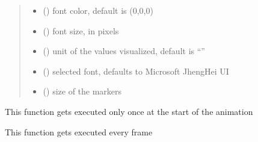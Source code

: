 \documentclass[letterpaper,10pt,english]{sphinxmanual}
\begin{document}
\begin{fulllineitems}
\begin{quote}
\begin{description}
\begin{itemize}
\item {} 
\sphinxAtStartPar
{} () \textendash{} font color, default is (0,0,0)

\item {} 
\sphinxAtStartPar
{} () \textendash{} font size, in pixels

\item {} 
\sphinxAtStartPar
{} () \textendash{} unit of the values visualized, default is “”

\item {} 
\sphinxAtStartPar
{} () \textendash{} selected font, defaults to Microsoft JhengHei UI

\item {} 
\sphinxAtStartPar
{} () \textendash{} size of the markers

\end{itemize}

\end{description}\end{quote}

\begin{fulllineitems}
\label{\detokenize{index:sjvisualizer.DynamicLine.dynamic_curve.draw}}
\pysigstartsignatures
{}
\pysigstopsignatures
\sphinxAtStartPar
This function gets executed only once at the start of the animation

\end{fulllineitems}


\begin{fulllineitems}
\label{\detokenize{index:sjvisualizer.DynamicLine.dynamic_curve.update}}
\pysigstartsignatures
{}
\pysigstopsignatures
\sphinxAtStartPar
This function gets executed every frame


\end{fulllineitems}
\end{fulllineitems}
\end{document}
